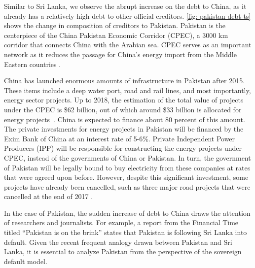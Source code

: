 Similar to Sri Lanka, we observe the abrupt increase on the debt to China, as it already has a relatively high debt to other official creditors. \autoref{fig: pakistan-debt-ts} shows the change in composition of creditors to Pakistan. 
Pakistan is the centerpiece of the China Pakistan Economic Corridor (CPEC), a 3000 km corridor that connects China with the Arabian sea.
CPEC serves as an important network as it reduces the passage for China's energy import from the Middle Eastern countries \citep*{CPEC-wiki}.

China has launched enormous amounts of infrastructure in Pakistan after 2015. These items include a deep water port, road and rail lines, and most importantly, energy sector projects. Up to 2018, the estimation of the total value of projects under the CPEC is \$62 billion, out of which around \$33 billion is allocated for energy projects~\citep*{Hurley19-8-debt-trap}. China is expected to finance about 80 percent of this amount. The private investments for energy projects in Pakistan will be financed by the Exim Bank of China at an interest rate of 5-6\%. 
Private Independent Power Producers (IPP) will be responsible for constructing the energy projects under CPEC, instead of the governments of China or Pakistan. In turn, the government of Pakistan will be legally bound to buy electricity from these companies at rates that were agreed upon before.
However, despite this significant investment, some projects have already been cancelled, such as three major road projects that were cancelled at the end of 2017 \citep*{Hurley19-8-debt-trap}.

In the case of Pakistan, the sudden increase of debt to China draws the attention of researchers and journalists. For example, a report from the Financial Time titled ``Pakistan is on the brink'' states that Pakistan is following Sri Lanka into default. Given the recent frequent analogy drawn between Pakistan and Sri Lanka, it is essential to analyze Pakistan from the perspective of the sovereign default model.
